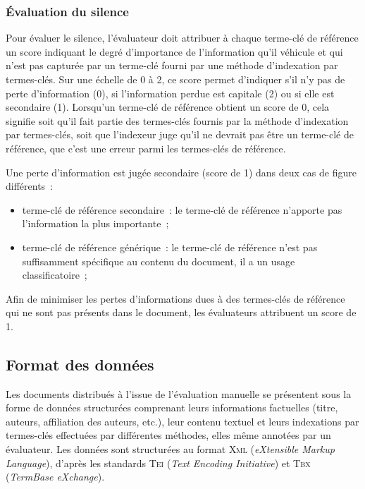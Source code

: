       \subsubsection{Évaluation du silence}
      \label{subsubsec:main-automatic_evaluation_of_keyphrase_annotation-methodology-evaluation_protocol-silence}
        Pour évaluer le silence, l'évaluateur doit attribuer à chaque terme-clé
        de référence un score indiquant le degré d'importance de l'information
        qu'il véhicule et qui n'est pas capturée par un terme-clé fourni par une
        méthode d'indexation par termes-clés. Sur une échelle de 0 à 2, ce score
        permet d'indiquer s'il n'y pas de perte d'information (0), si
        l'information perdue est capitale (2) ou si elle est secondaire (1).
        Lorsqu'un terme-clé de référence obtient un score de 0, cela signifie
        soit qu'il fait partie des termes-clés fournis par la méthode
        d'indexation par termes-clés, soit que l'indexeur juge qu'il ne devrait
        pas être un terme-clé de référence, que c'est une erreur parmi les
        termes-clés de référence.

        Une perte d'information est jugée secondaire (score de 1) dans deux
        cas de figure différents~:
        \begin{itemize}
          \item{terme-clé de référence secondaire~: le terme-clé de référence
                n'apporte pas l'information la plus importante~;}
          \item{terme-clé de référence générique~: le terme-clé de référence
                n'est pas suffisamment spécifique au contenu du document, il a
                un usage classificatoire~;}
        \end{itemize}
        Afin de minimiser les pertes d'informations dues à des termes-clés de
        référence qui ne sont pas présents dans le document, les évaluateurs
        attribuent un score de 1.



    \subsection{Format des données}
    \label{subsec:main-automatic_evaluation_of_keyphrase_annotation-methodology-data_format}
      Les documents distribués à l'issue de l'évaluation manuelle se présentent
      sous la forme de données structurées comprenant leurs informations
      factuelles (titre, auteurs, affiliation des auteurs, etc.), leur contenu
      textuel et leurs indexations par termes-clés effectuées par différentes
      méthodes, elles même annotées par un évaluateur. Les données sont
      structurées au format \textsc{Xml} (\textit{eXtensible Markup Language}),
      d'après les standards \textsc{Tei} (\textit{Text Encoding Initiative}) et
      \textsc{Tbx} (\textit{TermBase eXchange}).

